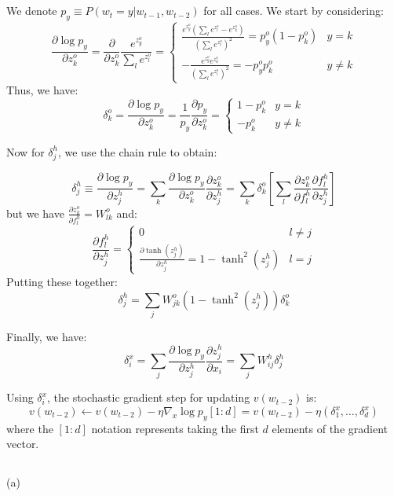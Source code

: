 \documentclass[psamsfonts]{amsart}
\theoremstyle{definition}
\theoremstyle{remark}
\numberwithin{equation}{section}
\begin{document}
\subsection{} We denote $p_y \equiv P(w_t = y|w_{t-1}, w_{t-2})$ for all cases. We start by considering:
$$\frac{\partial \log p_y}{\partial z_{k}^o} = \frac{\partial}{\partial z_k^o} \frac{e^{z_y^o}}{\sum_l e^{z_l^o}} = \left\{ \begin{matrix} \frac{e^{z_y^o}\left( \sum_l e^{z_l^o} - e^{z_k^o} \right)}{\left(\sum_l e^{z_l^o} \right)^2} = p_y^o(1-p_k^o) & y = k \\ -\frac{e^{z_y^o}e^{z_k^o}}{\left(\sum_l e^{z_l^o} \right)^2} = -p_y^o p_k^o & y \neq k \end{matrix} \right.$$
Thus, we have:
$$\delta_k^o = \frac{\partial \log p_y}{\partial z_k^o} = \frac{1}{p_y} \frac{\partial p_y}{\partial z_k^o} = \left\{ \begin{matrix} 1-p_k^o & y = k \\ -p_k^o & y\neq k \end{matrix} \right.$$

Now for $\delta_j^h$, we use the chain rule to obtain:

$$\delta_j^h \equiv \frac{\partial \log p_y}{\partial z_j^h} = \sum_k \frac{\partial \log p_y}{\partial z_k^o} \frac{\partial z_k^o}{\partial z_j^h} = \sum_k \delta_k^o \left[ \sum_l \frac{\partial z_k^o}{\partial f_l^h}\frac{\partial f_l^h}{\partial z_j^h} \right]$$
but we have $\frac{\partial z_k^o}{\partial f_l^h} = W_{lk}^o$ and:
$$\frac{\partial f_l^h}{\partial z_j^h} = \left\{ \begin{matrix} 0 & l \neq j \\ \frac{\partial \tanh(z_j^h)}{\partial z_j^h} = 1-\tanh^2(z_j^h) & l = j \end{matrix} \right.$$
Putting these together:
$$\delta_j^h = \sum_j W_{jk}^o (1-\tanh^2(z_j^h)) \delta_k^o$$

Finally, we have:
$$\delta_i^x = \sum_j \frac{\partial \log p_y}{\partial z_j^h}\frac{\partial z_j^h}{\partial x_i} = \sum_j W_{ij}^h\delta_j^h$$

Using $\delta_i^x$, the stochastic gradient step for updating $v(w_{t-2})$ is:
$$v(w_{t-2}) \leftarrow v(w_{t-2}) - \eta \nabla_{x} \log p_y[1:d] = v(w_{t-2}) - \eta (\delta_1^x, \dots, \delta_d^x)$$
where the $[1:d]$ notation represents taking the first $d$ elements of the gradient vector. 

\subsection{} (a)
\end{document}

